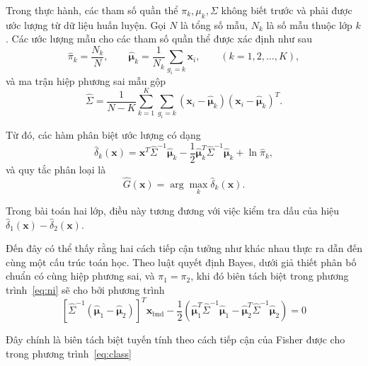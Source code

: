 Trong thực hành, các tham số quần thể $\pi_k,\mu_k,\Sigma$ không biết trước và phải được ước lượng từ dữ liệu huấn luyện. Gọi $N$ là tổng số mẫu, $N_k$ là số mẫu thuộc lớp $k$. Các ước lượng mẫu cho các tham số quần thể được xác định như sau
\begin{equation}
	\hat{\pi}_k=\frac{N_k}{N},
	\qquad
	\hat{\bm{\mu}}_k
	=
	\frac{1}{N_k}
	\sum_{g_i=k}
	\bm{x}_i,
	\qquad (k=1,2,\ldots,K),
\end{equation}
và ma trận hiệp phương sai mẫu gộp
\begin{equation}
	\hat{\Sigma}
	=
	\frac{1}{N-K}
	\sum_{k=1}^{K}
	\sum_{g_i=k}
	(\bm{x}_i-\hat{\bm{\mu}}_k)
	(\bm{x}_i-\hat{\bm{\mu}}_k)^T.
\end{equation}

Từ đó, các hàm phân biệt ước lượng có dạng
\begin{equation}
	\hat{\delta}_k(\bm{x})
=
\bm{x}^T\hat{\Sigma}^{-1}\hat{\bm{\mu}}_k
-\frac12
\hat{\bm{\mu}}_k^T\hat{\Sigma}^{-1}\hat{\bm{\mu}}_k
+\ln\hat{\pi}_k,
\end{equation}
và quy tắc phân loại là
\begin{equation}
	\hat{G}(\bm{x})
=
\arg\max_k \hat{\delta}_k(\bm{x}).
\end{equation}

Trong bài toán hai lớp, điều này tương đương với việc kiểm tra dấu của hiệu $\hat{\delta}_1(\bm{x})-\hat{\delta}_2(\bm{x})$.

\hspace*{0.5cm}Đến đây có thể thấy rằng hai cách tiếp cận tưởng như khác nhau thực ra dẫn đến cùng một cấu trúc toán học. Theo luật quyết định Bayes, dưới giả thiết phân bố chuẩn có cùng hiệp phương sai, và $\pi_1=\pi_2$, khi đó biên tách biệt trong phương trình~\eqref{eq:ni} sẽ cho bởi phương trình
\begin{equation}
\boxed{
	\left[
	\hat{\Sigma}^{-1}
	(\hat{\bm{\mu}}_1-\hat{\bm{\mu}}_2)
	\right]^T
	\bm{x}_{\text{bnd}}
	-
	\frac{1}{2}
	\left(
	\hat{\bm{\mu}}_1^T
	\hat{\Sigma}^{-1}
	\hat{\bm{\mu}}_1
	-
	\hat{\bm{\mu}}_2^T
	\hat{\Sigma}^{-1}
	\hat{\bm{\mu}}_2
	\right)
	=
	0
}
\label{eq:class1}
\end{equation}

Đây chính là biên tách biệt tuyến tính theo cách tiếp cận của Fisher được cho trong phương trình~\eqref{eq:class} 
